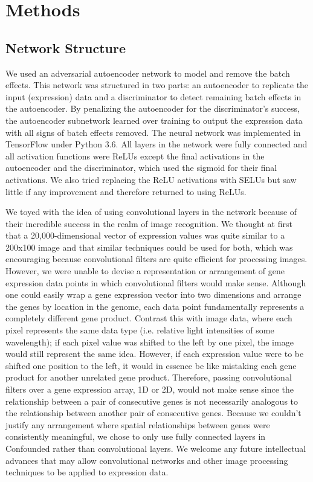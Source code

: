 \documentclass[notitlepage]{article}
\begin{document}
\section{Methods} \label{sec:methods}

\subsection{Network Structure}

We used an adversarial autoencoder network to model and remove the batch effects.
This network was structured in two parts: an autoencoder to replicate the input (expression) data and a discriminator to detect remaining batch effects in the autoencoder.
By penalizing the autoencoder for the discriminator's success, the autoencoder subnetwork learned over training to output the expression data with all signs of batch effects removed.
The neural network was implemented in TensorFlow under Python 3.6.
All layers in the network were fully connected and all activation functions were ReLUs \cite{agarap_deep_2018} except the final activations in the autoencoder and the discriminator, which used the sigmoid for their final activations.
We also tried replacing the ReLU activations with SELUs \cite{klambauer_self-normalizing_2017} but saw little if any improvement and therefore returned to using ReLUs.

We toyed with the idea of using convolutional layers \cite{krizhevsky_imagenet_2012-1} in the network because of their incredible success in the realm of image recognition.
We thought at first that a 20,000-dimensional vector of expression values was quite similar to a 200x100 image and that similar techniques could be used for both, which was encouraging because convolutional filters are quite efficient for processing images.
However, we were unable to devise a representation or arrangement of gene expression data points in which convolutional filters would make sense.
Although one could easily wrap a gene expression vector into two dimensions and arrange the genes by location in the genome, each data point fundamentally represents a completely different gene product.
Contrast this with image data, where each pixel represents the same data type (i.e. relative light intensities of some wavelength); if each pixel value was shifted to the left by one pixel, the image would still represent the same idea.
However, if each expression value were to be shifted one position to the left, it would in essence be like mistaking each gene product for another unrelated gene product.
Therefore, passing convolutional filters over a gene expression array, 1D or 2D, would not make sense since the relationship between a pair of consecutive genes is not necessarily analogous to the relationship between another pair of consecutive genes.
Because we couldn't justify any arrangement where spatial relationships between genes were consistently meaningful, we chose to only use fully connected layers in Confounded rather than convolutional layers.
We welcome any future intellectual advances that may allow convolutional networks and other image processing techniques to be applied to expression data.
\end{document}
